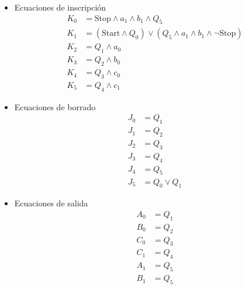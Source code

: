 \documentclass[a4paper,12pt]{article}
\begin{document}
\begin{itemize}
 \item Ecuaciones de inscripción
 \begin{align}
  K_0 &= \text{Stop} \land a_1 \land b_1 \land Q_5 \\
  K_1 &= (\text{Start} \land Q_0) \lor (Q_5 \land a_1 \land b_1 \land \lnot \text{Stop})\\
  K_2 &= Q_1 \land a_0\\
  K_3 &= Q_2 \land b_0\\
  K_4 &= Q_3 \land c_0\\
  K_5 &= Q_4 \land c_1
 \end{align}

%
\item Ecuaciones de borrado
\begin{align}
 J_0 &= Q_1\\
 J_1 &= Q_2\\
 J_2 &= Q_3\\
 J_3 &= Q_4\\
 J_4 &= Q_5\\
 J_5 &= Q_0 \lor Q_1
\end{align}
%
\item Ecuaciones de salida
\begin{align}
 A_0 &= Q_1\\
 B_0 &= Q_2\\
 C_0 &= Q_3\\
 C_1 &= Q_4\\
 A_1 &= Q_5\\
 B_1 &= Q_5
\end{align}

\end{itemize}




\end{document}
